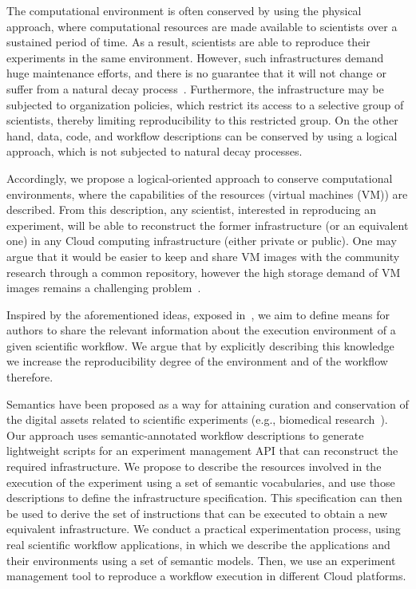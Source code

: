The computational environment is often conserved by using the physical approach, where 
computational resources are made available to scientists over a sustained period of time. 
As a result, scientists are able to reproduce their experiments in the same environment. 
However, such infrastructures demand huge maintenance efforts, and there is no guarantee 
that it will not change or suffer from a natural decay process~\cite{Gavish2011637}. 
Furthermore, the infrastructure may be subjected to organization policies, which restrict 
its access to a selective group of scientists, thereby limiting reproducibility to this restricted 
group. On the other hand, data, code, and workflow descriptions can be conserved by using 
a logical approach, which is not subjected to natural decay processes.

Accordingly, we propose a logical-oriented approach to conserve computational environments, 
where the capabilities of the resources (virtual machines (VM)) are described. From this 
description, any scientist, interested in reproducing an experiment, will be able to reconstruct 
the former infrastructure (or an equivalent one) in any Cloud computing infrastructure (either 
private or public). One may argue that it would be easier to keep and share VM images with 
the community research through a common repository, however the high storage demand of 
VM images remains a challenging problem~\cite{Mao:2014:ROD:2600090.2512348,6552826}. 


Inspired by the aforementioned ideas, exposed in~\cite{King1995}, we aim to  define means 
for authors to share the relevant information about the execution environment of a given scientific
workflow. We argue that by explicitly describing this knowledge we increase the reproducibility
degree of the environment and of the workflow therefore.

Semantics have been proposed as a way for attaining curation and conservation of the digital 
assets related to scientific experiments (e.g., biomedical research~\cite{MaloneSWO2014}). 
Our approach uses semantic-annotated workflow descriptions to generate lightweight scripts 
for an experiment management API that can reconstruct the required infrastructure. We 
propose to describe the resources involved in the execution of the experiment using a set of 
semantic vocabularies, and use those descriptions to define the infrastructure specification. 
This specification can then be used to derive the set of instructions that can be executed to 
obtain a new equivalent infrastructure. We conduct a practical experimentation process,  using real scientific 
workflow applications, in which we describe the applications and their environments using a 
set of semantic models. Then, we use an experiment management tool to reproduce a 
workflow execution in different Cloud platforms.

